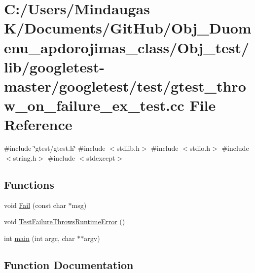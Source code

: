 \hypertarget{_obj__test_2lib_2googletest-master_2googletest_2test_2gtest__throw__on__failure__ex__test_8cc}{}\section{C\+:/\+Users/\+Mindaugas K/\+Documents/\+Git\+Hub/\+Obj\+\_\+\+Duomenu\+\_\+apdorojimas\+\_\+class/\+Obj\+\_\+test/lib/googletest-\/master/googletest/test/gtest\+\_\+throw\+\_\+on\+\_\+failure\+\_\+ex\+\_\+test.cc File Reference}
\label{_obj__test_2lib_2googletest-master_2googletest_2test_2gtest__throw__on__failure__ex__test_8cc}
{\ttfamily \#include \char`\"{}gtest/gtest.\+h\char`\"{}}\newline
{\ttfamily \#include $<$stdlib.\+h$>$}\newline
{\ttfamily \#include $<$stdio.\+h$>$}\newline
{\ttfamily \#include $<$string.\+h$>$}\newline
{\ttfamily \#include $<$stdexcept$>$}\newline
\subsection*{Functions}
\begin{DoxyCompactItemize}
\item 
void \mbox{\hyperlink{_obj__test_2lib_2googletest-master_2googletest_2test_2gtest__throw__on__failure__ex__test_8cc_a78ecbe7682643ac0413d57d0b9f27fa6}{Fail}} (const char $\ast$msg)
\item 
void \mbox{\hyperlink{_obj__test_2lib_2googletest-master_2googletest_2test_2gtest__throw__on__failure__ex__test_8cc_a3ddff869a4b3365dd7a9c3727b996a1d}{Test\+Failure\+Throws\+Runtime\+Error}} ()
\item 
int \mbox{\hyperlink{_obj__test_2lib_2googletest-master_2googletest_2test_2gtest__throw__on__failure__ex__test_8cc_a3c04138a5bfe5d72780bb7e82a18e627}{main}} (int argc, char $\ast$$\ast$argv)
\end{DoxyCompactItemize}


\subsection{Function Documentation}
\mbox{\label{_obj__test_2lib_2googletest-master_2googletest_2test_2gtest__throw__on__failure__ex__test_8cc_a78ecbe7682643ac0413d57d0b9f27fa6}} 
